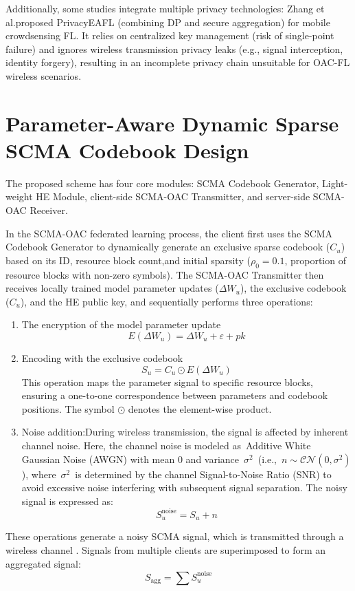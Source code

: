 \documentclass[runningheads]{llncs}
\begin{document}
Additionally, some studies integrate multiple privacy technologies: Zhang\cite{10251646} et al.proposed PrivacyEAFL (combining DP and secure aggregation) for mobile crowdsensing FL. It relies on centralized key management (risk of single-point failure) and ignores wireless transmission privacy leaks (e.g., signal interception, identity forgery), resulting in an incomplete privacy chain unsuitable for OAC-FL wireless scenarios.

\section{Parameter-Aware Dynamic Sparse SCMA Codebook Design}
The proposed scheme has four core modules: SCMA Codebook Generator, Light-\\ weight HE Module, client-side SCMA-OAC Transmitter, and server-side SCMA-OAC Receiver.  

In the SCMA-OAC federated learning process, the client first uses the SCMA Codebook Generator to dynamically generate an exclusive sparse codebook ($C_u$) based on its ID, resource block count,and initial sparsity ($\rho_0=0.1$, proportion of resource blocks with non-zero symbols).  
The SCMA-OAC Transmitter then receives locally trained model parameter updates ($\Delta W_u$), the exclusive codebook ($C_u$), and the HE public key, and sequentially performs three operations:
\begin{enumerate}
    
\item The encryption of the model parameter update\cite{lopez2012fly}
   \[
   E(\Delta W_u) = \Delta W_u + \varepsilon + pk \tag{1}
   \]
  
\item Encoding with the exclusive codebook 
   \[
   S_u = C_u \odot E(\Delta W_u) \tag{2}
   \]
   This operation maps the parameter signal to specific resource blocks, ensuring a one-to-one correspondence between parameters and codebook positions. The symbol $\odot$ denotes the element-wise product.
\item Noise addition:During wireless transmission, the signal is affected by inherent channel noise. Here, the channel noise is modeled as Additive White Gaussian Noise (AWGN) with mean 0 and variance \(\sigma^2\) (i.e., \(n \sim \mathcal{CN}(0, \sigma^2)\)), where \(\sigma^2\) is determined by the channel Signal-to-Noise Ratio (SNR) to avoid excessive noise interfering with subsequent signal separation. The noisy signal is expressed as:
   \[
   S_u^{\text{noise}} = S_u + n \tag{3}
   \]
\end{enumerate}
These operations generate a noisy SCMA signal, which is transmitted through a wireless channel . Signals from multiple clients are superimposed to form an aggregated signal:
\[
S_{\text{agg}} = \sum S_u^{\text{noise}} \tag{4}
\]
\end{document}

